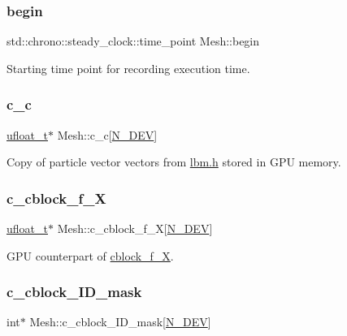 \subsubsection{\texorpdfstring{begin}{begin}}
{\footnotesize\ttfamily std\+::chrono\+::steady\+\_\+clock\+::time\+\_\+point Mesh\+::begin}



Starting time point for recording execution time. 

\mbox{\label{classMesh_a95f6a72b67aa96383233c21e269468de}} 
\subsubsection{\texorpdfstring{c\+\_\+c}{c\_c}}
{\footnotesize\ttfamily \hyperlink{cppspec_8h_af529d360dfac9b9578aa719418a53a21}{ufloat\+\_\+t}$\ast$ Mesh\+::c\+\_\+c\mbox{[}\hyperlink{cppspec_8h_a2b674dab7a14f1bf32b48b7fda5022dc}{N\+\_\+\+D\+EV}\mbox{]}}



Copy of particle vector vectors from \hyperlink{lbm_8h}{lbm.\+h} stored in G\+PU memory. 

\mbox{\label{classMesh_a5c57a491b5de8491aaa16cbed2bd8ffb}} 
\subsubsection{\texorpdfstring{c\+\_\+cblock\+\_\+f\+\_\+X}{c\_cblock\_f\_X}}
{\footnotesize\ttfamily \hyperlink{cppspec_8h_af529d360dfac9b9578aa719418a53a21}{ufloat\+\_\+t}$\ast$ Mesh\+::c\+\_\+cblock\+\_\+f\+\_\+X\mbox{[}\hyperlink{cppspec_8h_a2b674dab7a14f1bf32b48b7fda5022dc}{N\+\_\+\+D\+EV}\mbox{]}}



G\+PU counterpart of \hyperlink{classMesh_a6f0e622a1e6706f4c7ef3b86474fd654}{cblock\+\_\+f\+\_\+X}. 

\mbox{\label{classMesh_a74c11972ade088c320d82e2b219d924e}} 
\subsubsection{\texorpdfstring{c\+\_\+cblock\+\_\+\+I\+D\+\_\+mask}{c\_cblock\_ID\_mask}}
{\footnotesize\ttfamily int$\ast$ Mesh\+::c\+\_\+cblock\+\_\+\+I\+D\+\_\+mask\mbox{[}\hyperlink{cppspec_8h_a2b674dab7a14f1bf32b48b7fda5022dc}{N\+\_\+\+D\+EV}\mbox{]}}



